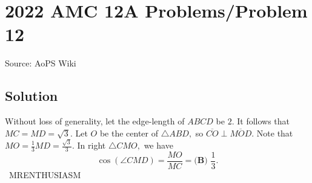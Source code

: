 \documentclass[12pt]{article}
\begin{document}
\section*{{2022 AMC 12A Problems/Problem 12}}
Source: AoPS Wiki

\subsection*{Solution}
Without loss of generality, let the edge-length of $ABCD$ be $2.$ It follows that $MC=MD=\sqrt3.$ Let $O$ be the center of $\triangle ABD,$ so $\overline{CO}\perp\overline{MOD}.$ Note that $MO=\frac13 MD=\frac{\sqrt{3}}{3}.$ In right $\triangle CMO,$ we have \[\cos(\angle CMD)=\frac{MO}{MC}=\boxed{\textbf{(B) } \frac13}.\] ~MRENTHUSIASM
\end{document}

